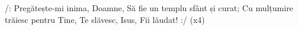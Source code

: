 \beginchorus
/: Pregătește-mi inima, Doamne,
Să fie un templu sfânt și curat;
Cu mulțumire trăiesc pentru Tine,
Te slăvesc, Isus,
Fii lăudat! :/ (x4)
\endchorus
\endsong